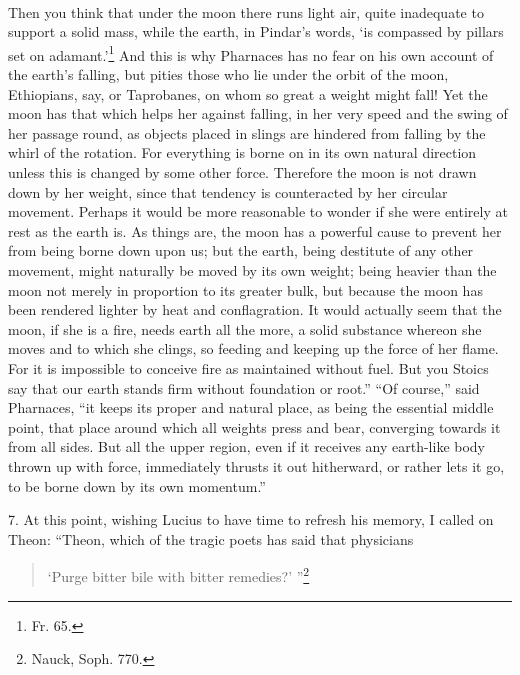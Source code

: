 \documentclass[a4paper, 11pt, oneside, polutonikogreek, english]{article}
\begin{document}
\paragraph{}
Then you think that under the moon there runs light air, quite inadequate to support a solid mass, while the earth, in Pindar's words, `is compassed by pillars set on adamant.'\footnote{Fr. 65.} And this is why Pharnaces has no fear on his own account of the earth's falling, but pities those who lie under the orbit of the moon, Ethiopians, say, or Taprobanes, on whom so great a weight might fall! Yet the moon has that which helps her against falling, in her very speed and the swing of her passage round, as objects placed in slings are hindered from falling by the whirl of the rotation. For everything is borne on in its own natural direction unless this is changed by some other force. Therefore the moon is not drawn down by her weight, since that tendency is counteracted by her circular movement. Perhaps it would be more reasonable to wonder if she were entirely at rest as the earth is. As things are, the moon has a powerful cause to prevent her from being borne down upon us; but the earth, being destitute of any other movement, might naturally be moved by its own weight; being heavier than the moon not merely in proportion to its greater bulk, but because the moon has been rendered lighter by heat and conflagration. It would actually seem that the moon, if she is a fire, needs earth all the more, a solid substance whereon she moves and to which she clings, so feeding and keeping up the force of her flame. For it is impossible to conceive fire as maintained without fuel. But you Stoics say that our earth stands firm without foundation or root.'' ``Of course,'' said Pharnaces, ``it keeps its proper and natural place, as being the essential middle point, that place around which all weights press and bear, converging towards it from all sides. But all the upper region, even if it receives any earth-like body thrown up with force, immediately thrusts it out hitherward, or rather lets it go, to be borne down by its own momentum.''

7. At this point, wishing Lucius to have time to refresh his memory, I called on Theon: ``Theon, which of the tragic poets has said that physicians
\begin{quotation}
`Purge bitter bile with bitter remedies?' ''\footnote{Nauck, Soph. 770.}
\end{quotation}
\end{document}
